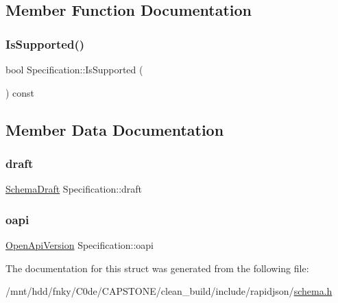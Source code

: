 \subsection{Member Function Documentation}
\mbox{\label{structSpecification_a49cac26e5a4562a75a8a85ae6298e870}} 
\subsubsection{\texorpdfstring{Is\+Supported()}{IsSupported()}}
{\footnotesize\ttfamily bool Specification\+::\+Is\+Supported (\begin{DoxyParamCaption}{ }\end{DoxyParamCaption}) const\hspace{0.3cm}{\ttfamily [inline]}}



\subsection{Member Data Documentation}
\mbox{\label{structSpecification_a3cc71ac1da84b59b19463d00c0ae0db3}} 
\subsubsection{\texorpdfstring{draft}{draft}}
{\footnotesize\ttfamily \hyperlink{schema_8h_a9804f9d7d7bd63131facb12bbeed41a9}{Schema\+Draft} Specification\+::draft}

\mbox{\label{structSpecification_a51e60efdc344044652e3c574c61b346e}} 
\subsubsection{\texorpdfstring{oapi}{oapi}}
{\footnotesize\ttfamily \hyperlink{schema_8h_adb8b5aa4bb19e8e6920000a9ceebf0cd}{Open\+Api\+Version} Specification\+::oapi}



The documentation for this struct was generated from the following file\+:\begin{DoxyCompactItemize}
\item 
/mnt/hdd/fnky/\+C0de/\+C\+A\+P\+S\+T\+O\+N\+E/clean\+\_\+build/include/rapidjson/\hyperlink{schema_8h}{schema.\+h}\end{DoxyCompactItemize}
